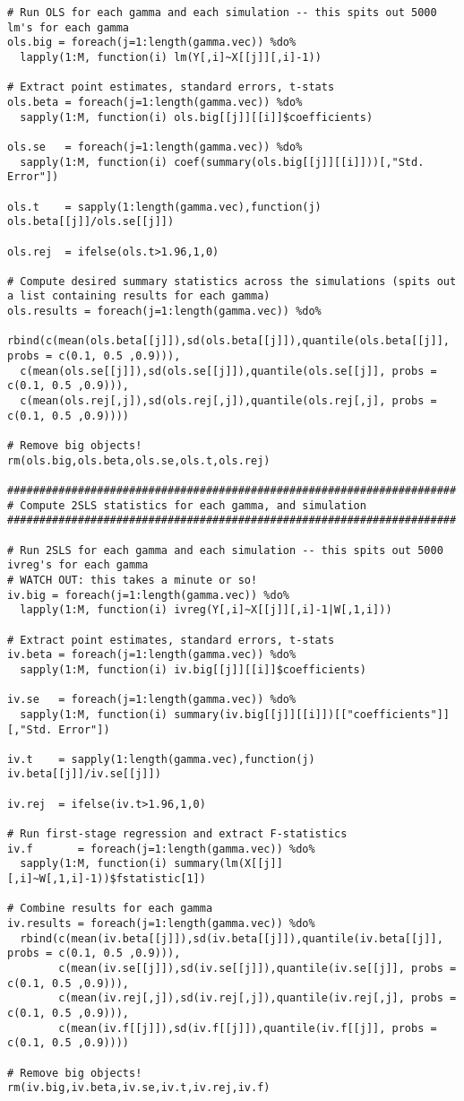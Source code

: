\documentclass[12pt]{article}
\begin{document}
\begin{verbatim}
# Run OLS for each gamma and each simulation -- this spits out 5000 lm's for each gamma
ols.big = foreach(j=1:length(gamma.vec)) %do%
  lapply(1:M, function(i) lm(Y[,i]~X[[j]][,i]-1))

# Extract point estimates, standard errors, t-stats
ols.beta = foreach(j=1:length(gamma.vec)) %do%
  sapply(1:M, function(i) ols.big[[j]][[i]]$coefficients)

ols.se   = foreach(j=1:length(gamma.vec)) %do%
  sapply(1:M, function(i) coef(summary(ols.big[[j]][[i]]))[,"Std. Error"])

ols.t    = sapply(1:length(gamma.vec),function(j) ols.beta[[j]]/ols.se[[j]])

ols.rej  = ifelse(ols.t>1.96,1,0)

# Compute desired summary statistics across the simulations (spits out a list containing results for each gamma)
ols.results = foreach(j=1:length(gamma.vec)) %do%
  rbind(c(mean(ols.beta[[j]]),sd(ols.beta[[j]]),quantile(ols.beta[[j]], probs = c(0.1, 0.5 ,0.9))),
  c(mean(ols.se[[j]]),sd(ols.se[[j]]),quantile(ols.se[[j]], probs = c(0.1, 0.5 ,0.9))),
  c(mean(ols.rej[,j]),sd(ols.rej[,j]),quantile(ols.rej[,j], probs = c(0.1, 0.5 ,0.9))))

# Remove big objects!
rm(ols.big,ols.beta,ols.se,ols.t,ols.rej)

######################################################################
# Compute 2SLS statistics for each gamma, and simulation
######################################################################

# Run 2SLS for each gamma and each simulation -- this spits out 5000 ivreg's for each gamma
# WATCH OUT: this takes a minute or so!
iv.big = foreach(j=1:length(gamma.vec)) %do%
  lapply(1:M, function(i) ivreg(Y[,i]~X[[j]][,i]-1|W[,1,i]))

# Extract point estimates, standard errors, t-stats
iv.beta = foreach(j=1:length(gamma.vec)) %do%
  sapply(1:M, function(i) iv.big[[j]][[i]]$coefficients)

iv.se   = foreach(j=1:length(gamma.vec)) %do%
  sapply(1:M, function(i) summary(iv.big[[j]][[i]])[["coefficients"]][,"Std. Error"])

iv.t    = sapply(1:length(gamma.vec),function(j) iv.beta[[j]]/iv.se[[j]])

iv.rej  = ifelse(iv.t>1.96,1,0)

# Run first-stage regression and extract F-statistics
iv.f       = foreach(j=1:length(gamma.vec)) %do%
  sapply(1:M, function(i) summary(lm(X[[j]][,i]~W[,1,i]-1))$fstatistic[1])

# Combine results for each gamma
iv.results = foreach(j=1:length(gamma.vec)) %do%
  rbind(c(mean(iv.beta[[j]]),sd(iv.beta[[j]]),quantile(iv.beta[[j]], probs = c(0.1, 0.5 ,0.9))),
        c(mean(iv.se[[j]]),sd(iv.se[[j]]),quantile(iv.se[[j]], probs = c(0.1, 0.5 ,0.9))),
        c(mean(iv.rej[,j]),sd(iv.rej[,j]),quantile(iv.rej[,j], probs = c(0.1, 0.5 ,0.9))),
        c(mean(iv.f[[j]]),sd(iv.f[[j]]),quantile(iv.f[[j]], probs = c(0.1, 0.5 ,0.9))))

# Remove big objects!
rm(iv.big,iv.beta,iv.se,iv.t,iv.rej,iv.f)
\end{verbatim}
\end{document}
